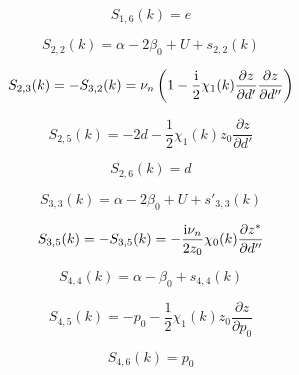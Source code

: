 \documentclass[showpacs,amsmath,twocolumn,floatfix]{revtex4-1}
\begin{document}
\begin{equation}
S_{1,6}(k) = e \nonumber 
\end{equation}

\begin{equation}
S_{2,2}(k) = \alpha - 2\beta_0 + U + s_{2,2}(k) \nonumber 
\end{equation}
  
\begin{equation}
S_{2,3}(k) = - S_{3,2}(k) = \nu_n \left(1  - \frac{\rm i}{2} \chi_1(k) 
\frac{\partial z}{\partial d'} \frac{\partial z}{\partial d''} \right)\nonumber 
\end{equation}  
  
\begin{equation}
S_{2,5}(k) = -2d - \frac{1}{2} \chi_1(k) z_0 \frac{\partial z}{\partial d'} \nonumber 
\end{equation} 

\begin{equation}
S_{2,6}(k) = d \nonumber 
\end{equation}  
  
\begin{equation}
S_{3,3}(k) = \alpha - 2 \beta_0 + U + s'_{3,3}(k) \nonumber 
\end{equation}

\begin{equation}
S_{3,5}(k)  = -S_{3,5}(k) = - \frac{{\rm i} \nu_n}{2 z_0} \chi_0(k)  
\frac{\partial z^*}{\partial d''}  \nonumber 
\end{equation}

\begin{equation}
S_{4,4}(k) = \alpha - \beta_0 + s_{4,4}(k) \nonumber 
\end{equation}


\begin{equation}
S_{4,5}(k) = -p_0 - \frac{1}{2} \chi_1(k) z_0 \frac{\partial z}{\partial p_0} \nonumber 
\end{equation} 

\begin{equation}
S_{4,6}(k) = p_0 \nonumber 
\end{equation}
\end{document}
